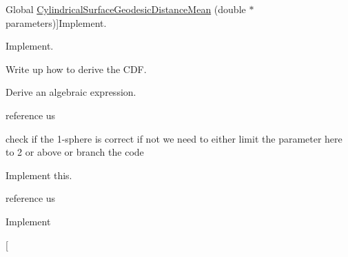 \begin{DoxyRefList}
\hypertarget{todo__todo000009}{}%
Global \hyperlink{_cylindrical_surface_geodesic_8h_a19c13f8592dcc528d0aaef9ea939ea9e}{Cylindrical\-Surface\-Geodesic\-Distance\-Mean} (double $\ast$parameters)]Implement.  
\item[\label{todo__todo000010}%
\hypertarget{todo__todo000010}{}%
Global \hyperlink{_cylindrical_surface_geodesic_8h_a6d5d130e133a07607923b92afa5bb1f6}{Cylindrical\-Surface\-Geodesic\-Distance\-Var} (double $\ast$parameters)]Implement.  
\item[\label{todo__todo000011}%
\hypertarget{todo__todo000011}{}%
Global \hyperlink{_disk_8h_a8958adae00c0c55d68c1e81deb51c06b}{Disk\-Distance\-C\-D\-F} (double a, double $\ast$b)]Write up how to derive the C\-D\-F.  
\item[\label{todo__todo000012}%
\hypertarget{todo__todo000012}{}%
Global \hyperlink{_disk_8h_a156ab336770f189207572a9282158392}{Disk\-Distance\-Var} (double $\ast$parameters)]Derive an algebraic expression.  
\item[\label{todo__todo000013}%
\hypertarget{todo__todo000013}{}%
Global \hyperlink{_hyper_sphere_8h_ac9f09ad018eaa239847e438a60d75aa3}{Hyper\-Sphere\-Distance\-P\-D\-F} (double t, double $\ast$parameters)]reference us  
\item[\label{todo__todo000016}%
\hypertarget{todo__todo000016}{}%
Global \hyperlink{_hyper_sphere_geodesic_8h_a0d1f54ac3a880c1c99d1ca5e85bd8256}{Hyper\-Sphere\-Geodesic\-Distance\-Check\-Parameters} (double $\ast$parameters, int $\ast$result, char $\ast$error\-\_\-str)]check if the 1-\/sphere is correct if not we need to either limit the parameter here to 2 or above or branch the code  
\item[\label{todo__todo000017}%
\hypertarget{todo__todo000017}{}%
Global \hyperlink{_hyper_sphere_geodesic_8h_a0fbca3fad98c691523aeb34eaab97d01}{Hyper\-Sphere\-Geodesic\-Distance\-Metric} (int Ncoords, double $\ast$point1, double $\ast$point2, double $\ast$parameters)]Implement this.  
\item[\label{todo__todo000014}%
\hypertarget{todo__todo000014}{}%
Global \hyperlink{_hyper_sphere_geodesic_8h_a16d98ff2d1ad0e4d662b8631c72f9931}{Hyper\-Sphere\-Geodesic\-Distance\-P\-D\-F} (double t, double $\ast$parameters)]reference us  
\item[\label{todo__todo000015}%
\hypertarget{todo__todo000015}{}%
Global \hyperlink{_hyper_sphere_geodesic_8h_a203990a77a11670e5ab591d64461fca4}{Hyper\-Sphere\-Geodesic\-Distance\-Var} (double $\ast$parameters)]Implement  
\item[\label{todo__todo000021}%

\end{DoxyRefList}

